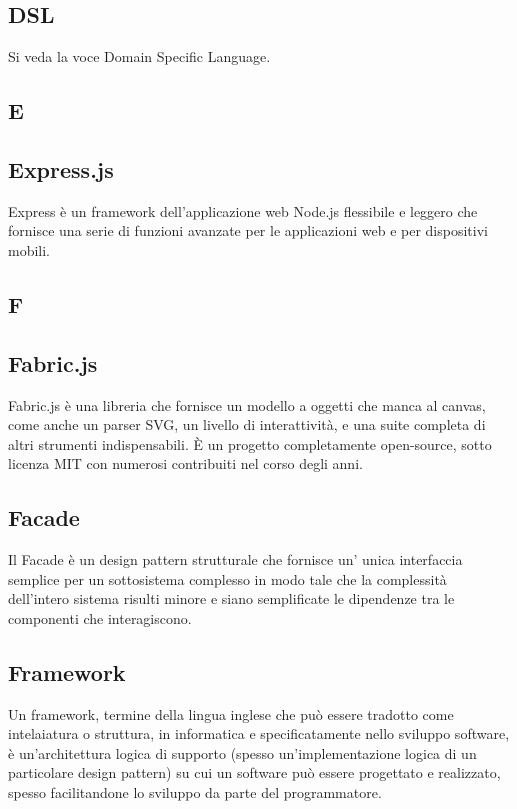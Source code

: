 \subsection{DSL}
Si veda la voce Domain Specific Language.

\newpage

\begin{center}
\Huge\section{\uppercase{E}}
\end{center}

\subsection{Express.js}
Express è un framework dell'applicazione web Node.js flessibile e leggero che fornisce una serie di funzioni avanzate per le applicazioni web e per dispositivi mobili.

\newpage

\begin{center}
\Huge\section{\uppercase{F}}
\end{center}

\subsection{Fabric.js}
Fabric.js è una libreria che fornisce un modello a oggetti che manca al canvas, come anche un parser SVG, un livello di interattività, e una suite completa di altri strumenti indispensabili. È un progetto completamente open-source, sotto licenza MIT con numerosi contribuiti nel corso degli anni.

\subsection{Facade}
Il Facade è un design pattern strutturale che fornisce un' unica interfaccia semplice per un sottosistema complesso in modo tale che la complessità dell'intero sistema risulti minore e siano
semplificate le dipendenze tra le componenti che interagiscono.

\subsection{Framework}
Un framework, termine della lingua inglese che può essere tradotto come intelaiatura o struttura, in informatica e specificatamente nello sviluppo software, è un'architettura logica di supporto (spesso un'implementazione logica di un particolare design pattern) su cui un software può essere progettato e realizzato, spesso facilitandone lo sviluppo da parte del programmatore.

